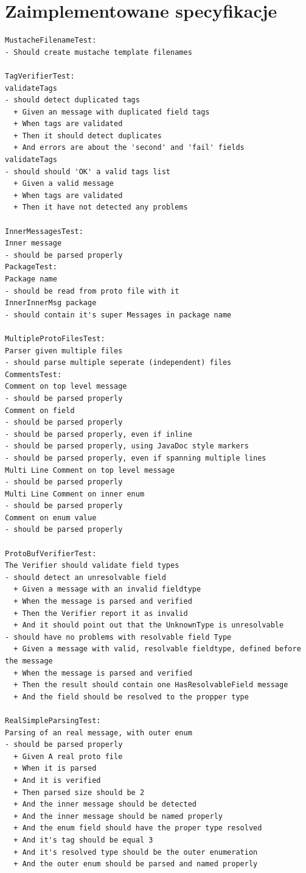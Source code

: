 \documentclass[pdflatex,11pt]{aghdpl}
\begin{document}
\section{Zaimplementowane specyfikacje}
\begin{verbatim}
MustacheFilenameTest:
- Should create mustache template filenames

TagVerifierTest:
validateTags 
- should detect duplicated tags
  + Given an message with duplicated field tags 
  + When tags are validated 
  + Then it should detect duplicates 
  + And errors are about the 'second' and 'fail' fields 
validateTags 
- should should 'OK' a valid tags list
  + Given a valid message 
  + When tags are validated 
  + Then it have not detected any problems 

InnerMessagesTest:
Inner message 
- should be parsed properly
PackageTest:
Package name 
- should be read from proto file with it
InnerInnerMsg package 
- should contain it's super Messages in package name

MultipleProtoFilesTest:
Parser given multiple files 
- should parse multiple seperate (independent) files
CommentsTest:
Comment on top level message 
- should be parsed properly
Comment on field 
- should be parsed properly
- should be parsed properly, even if inline
- should be parsed properly, using JavaDoc style markers
- should be parsed properly, even if spanning multiple lines
Multi Line Comment on top level message 
- should be parsed properly
Multi Line Comment on inner enum 
- should be parsed properly
Comment on enum value 
- should be parsed properly

ProtoBufVerifierTest:
The Verifier should validate field types 
- should detect an unresolvable field
  + Given a message with an invalid fieldtype 
  + When the message is parsed and verified 
  + Then the Verifier report it as invalid 
  + And it should point out that the UnknownType is unresolvable 
- should have no problems with resolvable field Type
  + Given a message with valid, resolvable fieldtype, defined before the message 
  + When the message is parsed and verified 
  + Then the result should contain one HasResolvableField message 
  + And the field should be resolved to the propper type 

RealSimpleParsingTest:
Parsing of an real message, with outer enum 
- should be parsed properly
  + Given A real proto file 
  + When it is parsed 
  + And it is verified 
  + Then parsed size should be 2 
  + And the inner message should be detected 
  + And the inner message should be named properly 
  + And the enum field should have the proper type resolved 
  + And it's tag should be equal 3 
  + And it's resolved type should be the outer enumeration 
  + And the outer enum should be parsed and named properly 


\end{verbatim}
\end{document}
